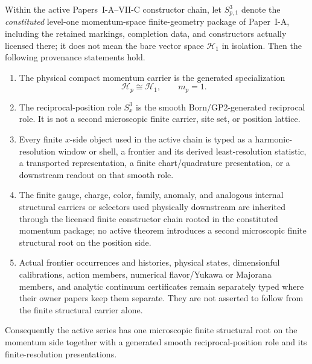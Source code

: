 \documentclass[12pt,a4paper]{article}
\begin{document}
\begin{theorem}
\label{p12:thm:momentum-rooted-finite-structural-provenance}
Within the active Papers~I-A--VII-C constructor chain, let
\(S^3_{p,1}\) denote the \emph{constituted} level-one momentum-space
finite-geometry package of Paper~I-A, including the retained markings,
completion data, and constructors actually licensed there; it does not mean
the bare vector space \(\mathcal H_1\) in isolation.  Then the following
provenance statements hold.
\begin{enumerate}
\item The physical compact momentum carrier is the generated specialization
\[
   \mathcal H_p\cong\mathcal H_1,\qquad m_p=1.
\]
\item The reciprocal-position role \(S_x^3\) is the smooth Born/GP2-generated
reciprocal role.  It is not a second microscopic finite carrier, site set, or
position lattice.
\item Every finite \(x\)-side object used in the active chain is typed as a
harmonic-resolution window or shell, a frontier and its derived
least-resolution statistic, a transported representation, a finite
chart/quadrature presentation, or a downstream readout on that smooth role.
\item The finite gauge, charge, color, family, anomaly, and analogous internal
structural carriers or selectors used physically downstream are inherited
through the licensed finite constructor chain rooted in the constituted
momentum package; no active theorem introduces a second microscopic finite
structural root on the position side.
\item Actual frontier occurrences and histories, physical states,
dimensionful calibrations, action members, numerical flavor/Yukawa or
Majorana members, and analytic continuum certificates remain separately typed
where their owner papers keep them separate.  They are not asserted to follow
from the finite structural carrier alone.
\end{enumerate}
Consequently the active series has one microscopic finite structural root on
the momentum side together with a generated smooth reciprocal-position role
and its finite-resolution presentations.
\end{theorem}
\end{document}
